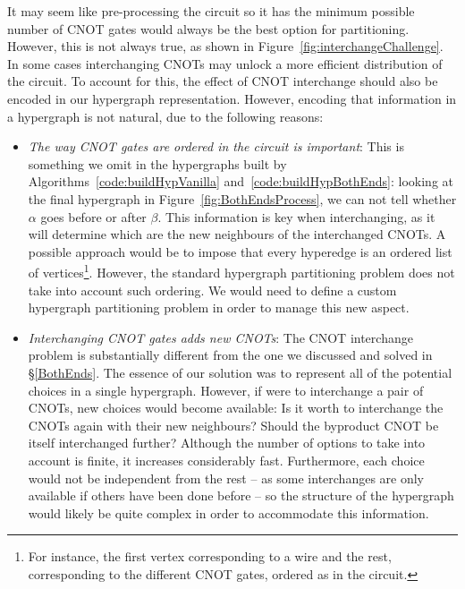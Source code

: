 



It may seem like pre-processing the circuit so it has the minimum possible number of CNOT gates would always be the best option for partitioning. However, this is not always true, as shown in Figure~\ref{fig:interchangeChallenge}. In some cases interchanging CNOTs may unlock a more efficient distribution of the circuit. To account for this, the effect of CNOT interchange should also be encoded in our hypergraph representation. However, encoding that information in a hypergraph is not natural, due to the following reasons:

\begin{itemize}
  \item \textit{The way CNOT gates are ordered in the circuit is important}: This is something we omit in the hypergraphs built by Algorithms~\ref{code:buildHypVanilla} and~\ref{code:buildHypBothEnds}: looking at the final hypergraph in Figure~\ref{fig:BothEndsProcess}, we can not tell whether \(\alpha\) goes before or after \(\beta\). This information is key when interchanging, as it will determine which are the new neighbours of the interchanged CNOTs. A possible approach would be to impose that every hyperedge is an ordered list of vertices\footnote{For instance, the first vertex corresponding to a wire and the rest, corresponding to the different CNOT gates, ordered as in the circuit.}. However, the standard hypergraph partitioning problem does not take into account such ordering. We would need to define a custom hypergraph partitioning problem in order to manage this new aspect.

  \item \textit{Interchanging CNOT gates adds new CNOTs}: The CNOT interchange problem is substantially different from the one we discussed and solved in \S\ref{BothEnds}. The essence of our solution was to represent all of the potential choices in a single hypergraph. However, if were to interchange a pair of CNOTs, new choices would become available: Is it worth to interchange the CNOTs again with their new neighbours? Should the byproduct CNOT be itself interchanged further? Although the number of options to take into account is finite, it increases considerably fast. Furthermore, each choice would not be independent from the rest -- as some interchanges are only available if others have been done before -- so the structure of the hypergraph would likely be quite complex in order to accommodate this information.
\end{itemize}

